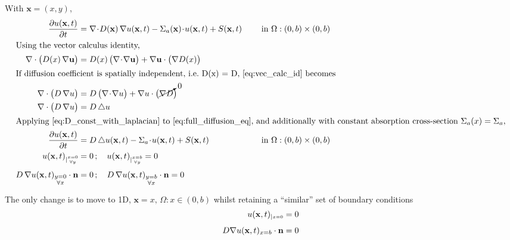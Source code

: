 \documentclass[a4paper]{article}
\newcommand{\doublerule}[1][.4pt]{%
  \noindent
  \makebox[0pt][l]{\rule[.7ex]{\linewidth}{#1}}%
  \rule[.3ex]{\linewidth}{#1}}
\newenvironment{MyColorPar}{%
        \leavevmode\color{imperialbrick}\ignorespaces%
    }{%
}%
\begin{document}
    \newpage
    \setcounter{equation}{0}
    With $\mathbf{x} = (x,y)$,
    \begin{alignat}{3}
        \diffp{u(\mathbf{x},t)}{t} &= \nabla\!\cdot\!D(\mathbf{x})\, \nabla u(\mathbf{x},t) - \Sigma_a(\mathbf{x})\!\cdot\!u(\mathbf{x},t) + S(\mathbf{x},t)   \quad && \text{ in } \Omega: (0,b) \times (0,b) \label{eq:full_diffusion_eq} \\
        \intertext{Using the vector calculus identity,}
        \nabla \cdot \big(D(x) \, \nabla\mathbf{u}\big)  &=  D(x) \,\big(\nabla\!\cdot \!\nabla\mathbf{u}\big) +  \nabla\mathbf{u} \cdot \big(\nabla D(x)\big) \label{eq:vec_calc_id} \\
        \intertext{If diffusion coefficient is spatially independent, i.e.\ D(x) = D, \cref{eq:vec_calc_id} becomes}
        \nabla \cdot \big(D \, \nabla u\big)  &=  D \,\big(\nabla\!\cdot \!\nabla u\big) +  \nabla u \cdot \big(\cancelto{0}{\nabla D}\big)  \\
        \nabla \cdot \big(D \, \nabla u\big)  &=  D \,\triangle u \label{eq:D_const_with_laplacian} \\
        \intertext{Applying \cref{eq:D_const_with_laplacian} to \cref{eq:full_diffusion_eq}, and additionally with constant absorption cross-section $\Sigma_a(x) = \Sigma_a$,}
        \diffp{u(\mathbf{x},t)}{t} &= D\, \triangle u(\mathbf{x},t) - \Sigma_a\!\cdot\!u(\mathbf{x},t) + S(\mathbf{x},t) \quad && \text{ in } \Omega: (0,b) \times (0,b) \label{eq:strong_form_pde} \\
        u(\mathbf{x},t)_{\Huge{\lvert}\scriptsize\substack{x=0\\\forall y}}   &= 0\,;\quad u(\mathbf{x},t)_{\Huge{\lvert}\scriptsize\substack{x=b\\\forall y}} = 0  \label{eq:bc1_2d}\\[1ex]
        D \, \nabla u(\mathbf{x},t)_{\substack{y=0\\\forall x}} \cdot \mathbf{n}&= 0\,; \quad D \, \nabla u(\mathbf{x},t)_{\substack{y=b\\\forall x}} \cdot \mathbf{n}= 0\label{eq:bc2_2d}
    \end{alignat}


    \begin{MyColorPar}
        The only change is to move to 1D, $\mathbf{x} = x,\, \Omega:x \in (0,b)$ whilst retaining a ``similar'' set of boundary conditions
        \begin{align}
            u(\mathbf{x},t)_{\Huge{\lvert}\scriptsize\substack{x=0}}   &= 0 \label{eq:dirichelet_bc1_1d}\\[1ex]
             D \nabla u(\mathbf{x},t)_{x=b}\cdot\mathbf{n} &= 0\label{eq:neumann_bc2_1d}
        \end{align}
    \end{MyColorPar}
\end{document}
